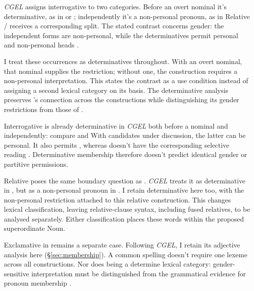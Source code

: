 \documentclass[12pt]{article}
\begin{document}
\textit{CGEL} assigns interrogative  to two categories. Before an overt nominal it's determinative, as in  or ; independently it's a non-personal pronoun, as in  Relative / receives a corresponding split. The stated contrast concerns gender: the independent forms are non-personal, while the determinatives permit personal and non-personal heads \citep[398]{huddleston2002}.

I treat these occurrences as determinatives throughout. With an overt nominal, that nominal supplies the restriction; without one, the construction requires a non-personal interpretation. This states the contrast as a use condition instead of assigning a second lexical category on its basis. The determinative analysis preserves 's connection across the constructions while distinguishing its gender restrictions from those of .

Interrogative  is already determinative in \textit{CGEL} both before a nominal and independently: compare  and  With candidates under discussion, the latter can be personal. It also permits , whereas  doesn't have the corresponding selective reading \citep[397--398]{huddleston2002}. Determinative membership therefore doesn't predict identical gender or partitive permissions.

Relative  poses the same boundary question as . \textit{CGEL} treats it as determinative in , but as a non-personal pronoun in  \citep[399]{huddleston2002}. I retain determinative here too, with the non-personal restriction attached to this relative construction. This changes lexical classification, leaving relative-clause syntax, including fused relatives, to be analysed separately. Either classification places these words within the proposed superordinate Noun.

Exclamative  in  remains a separate case. Following \textit{CGEL}, I retain its adjective analysis here (§\ref{sec:membership}). A common spelling doesn't require one lexeme across all constructions. Nor does being a  determine lexical category: gender-sensitive interpretation must be distinguished from the grammatical evidence for pronoun membership \citep{reynolds2025proformgender}.
\end{document}
